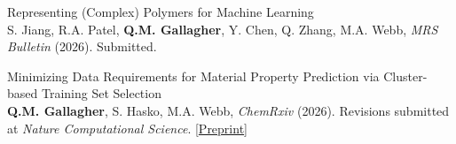 \documentclass[letterpaper,11pt]{article}
\begin{document}
\begin{etaremune}





\normalsize \item{Representing (Complex) Polymers for Machine Learning}\\
\vspace{2pt}
\small S. Jiang, R.A. Patel, \textbf{Q.M. Gallagher}, Y. Chen, Q. Zhang, M.A. Webb, \textit{MRS Bulletin} (2026). Submitted.

\normalsize \item{Minimizing Data Requirements for Material Property Prediction via Cluster-based Training Set Selection}\\
\vspace{2pt}
\small \textbf{Q.M. Gallagher}, S. Hasko, M.A. Webb, \textit{ChemRxiv} (2026). Revisions submitted at \textit{Nature Computational Science}.
[\href{https://chemrxiv.org/doi/full/10.26434/chemrxiv.15001127/v1}{Preprint}]


\end{etaremune}
\end{document}
